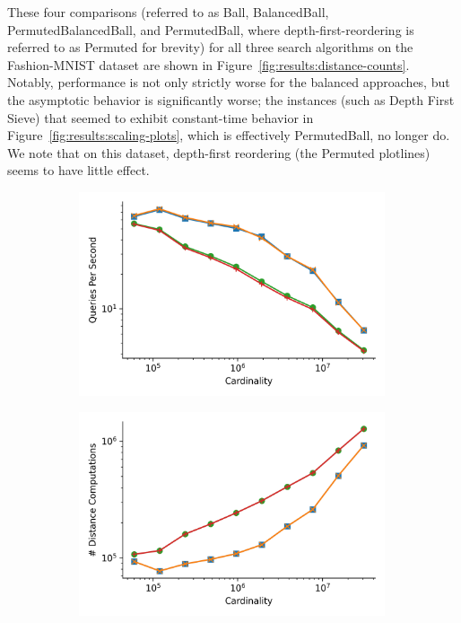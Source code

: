 These four comparisons (referred to as Ball, BalancedBall, PermutedBalancedBall, and PermutedBall, where depth-first-reordering is referred to as Permuted for brevity) for all three search algorithms on the Fashion-MNIST dataset are shown in Figure~\ref{fig:results:distance-counts}. Notably, performance is not only strictly worse for the balanced approaches, but the asymptotic behavior is significantly worse; the instances (such as Depth First Sieve) that seemed to exhibit constant-time behavior in Figure~\ref{fig:results:scaling-plots}, which is effectively PermutedBall, no longer do. We note that on this dataset, depth-first reordering (the Permuted plotlines) seems to have little effect.


\begin{figure}
    \begin{subfigure}[b]{0.5\textwidth}
        \includegraphics[width=0.99\textwidth]{images/distance_counts/fashion-mnist_KnnRepeatedRnn_10_throughput.png}
        \label{fig:results:fashion-mnist-counts-throughput}
    \end{subfigure}%
    \begin{subfigure}[b]{0.5\textwidth}
        \includegraphics[width=0.99\textwidth]{images/distance_counts/fashion-mnist_KnnRepeatedRnn_10_counts.png}

\end{subfigure}
\end{figure}
